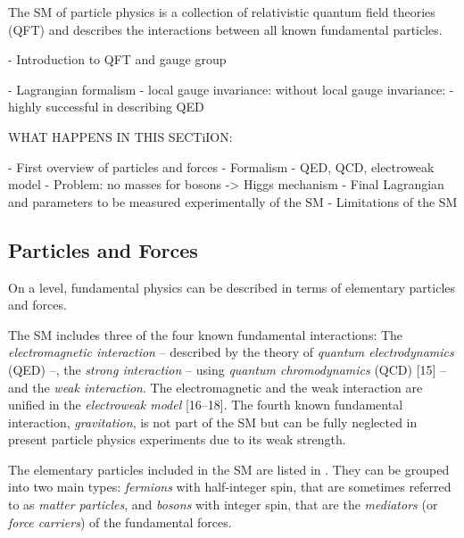

The SM of particle physics is a collection of relativistic quantum field theories (QFT) and describes the interactions between all known fundamental particles.

- Introduction to QFT and gauge group

- Lagrangian formalism
- local gauge invariance: without local gauge invariance:
- highly successful in describing QED

WHAT HAPPENS IN THIS SECTiION:

- First overview of particles and forces
- Formalism
- QED, QCD, electroweak model
- Problem: no masses for bosons -> Higgs mechanism
- Final Lagrangian and parameters to be measured experimentally of the SM
- Limitations of the SM

\subsection{Particles and Forces}
\label{sec:particle-content}
On a  level, fundamental physics can be described in terms of elementary particles and forces.

The SM includes three of the four known fundamental interactions: The \emph{electromagnetic interaction} -- described by the theory of \emph{quantum electrodynamics} (QED) --, the \emph{strong interaction} -- using \emph{quantum chromodynamics} (QCD) [15] -- and the \emph{weak interaction}. The electromagnetic and the weak interaction are unified in the \emph{electroweak model} [16–18]. The fourth known fundamental interaction, \emph{gravitation}, is not part of the SM but can be fully neglected in present particle physics experiments due to its weak strength.

The elementary particles included in the SM are listed in . They can be grouped into two main types: \emph{fermions} with half-integer spin, that are sometimes referred to as \emph{matter particles}, and \emph{bosons} with integer spin, that are the \emph{mediators} (or \emph{force carriers}) of the fundamental forces.

